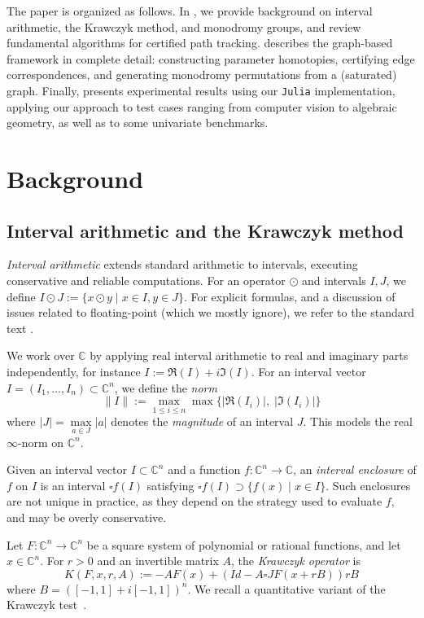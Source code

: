 \documentclass[11pt]{amsart}
\let\oldtextit\textit
\renewcommand\emph[1]{\oldtextit{\color{blue}#1}}
\theoremstyle{definition}
\theoremstyle{remark}
\begin{document}
The paper is organized as follows. In , we provide background on interval arithmetic, the Krawczyk method, and monodromy groups, and review fundamental algorithms for certified path tracking.  describes the graph-based framework in complete detail: constructing parameter homotopies, certifying edge correspondences, and generating monodromy permutations from a (saturated) graph. Finally,  presents experimental results using our \texttt{Julia} implementation, applying our approach to test cases ranging from computer vision to algebraic geometry, as well as to some univariate benchmarks.


\section{Background}\label{sec:background}

\subsection{Interval arithmetic and the Krawczyk method}
\emph{Interval arithmetic} extends standard arithmetic to intervals, executing conservative and reliable computations. For an operator $\odot$ and intervals $I,J$, we define $I \odot J := \{x\odot y \mid x\in I, y\in J\}$. For explicit formulas, and a discussion of issues related to floating-point (which we mostly ignore), we refer to the standard text \cite{moore2009introduction}.

We work over $\mathbb{C}$ by applying real interval arithmetic to real and imaginary parts independently, for instance $I:=\Re(I)+i\Im(I)$. For an interval vector $I=(I_1,\dots,I_n)\subset\mathbb{C}^n$, we define the \emph{norm}
\[
\|I\| := \max_{1\le i\le n} \max\{|\Re(I_i)|,\; |\Im(I_i)|\}
\]
where $|J| = \max\limits_{a\in J}|a|$ denotes the \emph{magnitude} of an interval $J$.
This models the real $\infty$-norm on $\mathbb{C}^n$.

Given an interval vector $I\subset\mathbb{C}^n$ and a function $f:\mathbb{C}^n\to\mathbb{C}$, an \emph{interval enclosure} of $f$ on $I$ is an interval $\square f(I)$ satisfying $\square f(I)\supset\{f(x)\mid x\in I\}$. Such enclosures are not unique in practice, as they depend on the strategy used to evaluate $f,$ and may be overly conservative.

Let $F:\mathbb{C}^n\to\mathbb{C}^n$ be a square system of polynomial or rational functions, and let $x\in\mathbb{C}^n$. For $r>0$ and an invertible matrix $A$, the \emph{Krawczyk operator} is
\[
K(F,x,r,A) := -AF(x) + (Id - A\square JF(x+rB)) rB
\]
where $B = ([-1,1]+i[-1,1])^n$.
We recall a quantitative variant of the Krawczyk test~\cite{krawczyk1969newton}.
\end{document}
